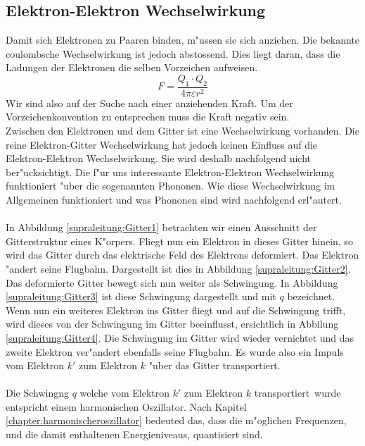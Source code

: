 \begin{refsection}
\section{Elektron-Elektron Wechselwirkung\label{supraleitung:elektronelektronwecheslwirkung}}
Damit sich Elektronen zu Paaren binden, m"ussen sie sich anziehen.
Die bekannte coulombsche Wechselwirkung ist jedoch abstossend. Dies liegt daran, dass die Ladungen der Elektronen die selben Vorzeichen aufweisen.
\begin{equation}
F = \frac{Q_1\cdot Q_2}{4\pi \varepsilon r^2}
\label{supraleitung:Coulomb}
\end{equation}
Wir sind also auf der Suche nach einer anziehenden Kraft.
Um der Vorzeichenkonvention zu entsprechen muss die Kraft negativ sein.
\\
Zwischen den Elektronen und dem Gitter ist eine Wechselwirkung vorhanden.
Die reine Elektron-Gitter Wechselwirkung hat jedoch keinen Einfluss auf die Elektron-Elektron Wechselwirkung.
Sie wird deshalb nachfolgend nicht ber"ucksichtigt.
Die f"ur uns interessante Elektron-Elektron Wechselwirkung funktioniert "uber die sogenannten Phononen.
Wie diese Wechselwirkung im Allgemeinen funktioniert und was Phononen sind wird nachfolgend erl"autert.
\\
\\
In Abbildung \ref{supraleitung:Gitter1} betrachten wir einen Ausschnitt der Gitterstruktur eines K"orpers.
Fliegt nun ein Elektron in dieses Gitter hinein, so wird das Gitter durch das elektrische Feld des Elektrons deformiert.
Das Elektron "andert seine Flugbahn.
Dargestellt ist dies in Abbildung \ref{supraleitung:Gitter2}.
Das deformierte Gitter bewegt sich nun weiter als Schwingung.
In Abbildung \ref{supraleitung:Gitter3} ist diese Schwingung dargestellt und mit $q$ bezeichnet.
Wenn nun ein weiteres Elektron ins Gitter fliegt und auf die Schwingung trifft, wird dieses von der Schwingung im Gitter beeinflusst, ersichtlich in Abbilung \ref{supraleitung:Gitter4}.
Die Schwingung im Gitter wird wieder vernichtet und das zweite Elektron ver"andert ebenfalls seine Flugbahn.
Es wurde also ein Impuls vom Elektron $k'$ zum Elektron $k$ "uber das Gitter transportiert. 
\\
\\
Die Schwingng $q$ welche vom Elektron $k'$ zum Elektron $k$ \glqq transportiert\grqq~wurde entspricht einem harmonischen Oszillator.
Nach Kapitel \ref{chapter:harmonischeroszillator} bedeuted das, dass die m"oglichen Frequenzen, und die damit enthaltenen Energieniveaus, quantisiert sind.

\end{refsection}

